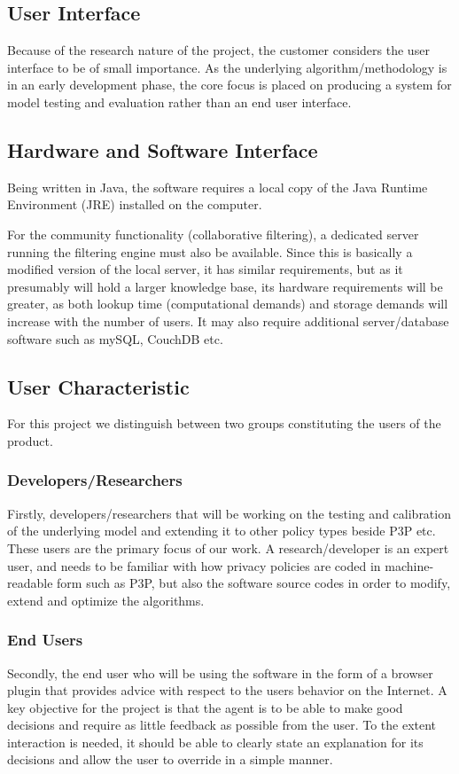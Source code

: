 \subsection{User Interface}
Because of the research nature of the project, the customer considers the user interface to be of small importance. As the underlying algorithm/methodology is in an early development phase, the core focus is placed on producing a system for model testing and evaluation rather than an end user interface. 

\subsection{Hardware and Software Interface}
Being written in Java, the software requires a local copy of the Java Runtime Environment (JRE) installed on the computer. 

For the community functionality (collaborative filtering), a dedicated server running the filtering engine must also be available. Since this is basically a modified version of the local server, it has similar requirements, but as it presumably will hold a larger knowledge base, its hardware requirements will be greater, as both lookup time (computational demands) and storage demands will increase with the number of users. It may also require additional server/database software such as mySQL, CouchDB etc. 

\subsection{User Characteristic}

For this project we distinguish between two groups constituting the users of the product. 
\subsubsection{Developers/Researchers}
Firstly, developers/researchers that will be working on the testing and calibration of the underlying model and extending it to other policy types beside P3P etc. These users are the primary focus of our work. A research/developer is an expert user, and needs to be familiar with how privacy policies are coded in machine-readable form such as P3P, but also the software source codes in order to modify, extend and optimize the algorithms. 

\subsubsection{End Users}
Secondly, the end user who will be using the software in the form of a browser plugin that provides advice with respect to the users behavior on the Internet. A key objective for the project is that the agent is to be able to make good decisions and require as little feedback as possible from the user. To the extent interaction is needed, it should be able to clearly state an explanation for its decisions and allow the user to override in a simple manner.


